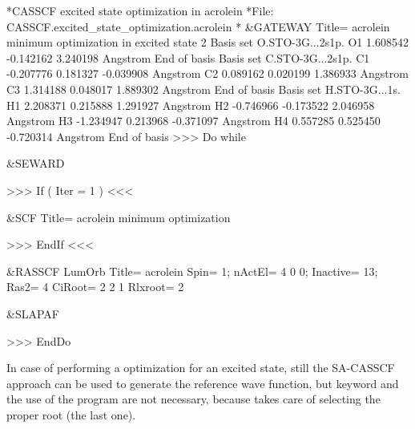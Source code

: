 \begin{inputlisting}
*CASSCF excited state optimization in acrolein
*File: CASSCF.excited_state_optimization.acrolein
*
 &GATEWAY
Title= acrolein minimum optimization in excited state 2
Basis set
O.STO-3G...2s1p.
O1       1.608542      -0.142162       3.240198 Angstrom
End of basis
Basis set
C.STO-3G...2s1p.
C1      -0.207776       0.181327      -0.039908 Angstrom
C2       0.089162       0.020199       1.386933 Angstrom
C3       1.314188       0.048017       1.889302 Angstrom
End of basis
Basis set
H.STO-3G...1s.
H1       2.208371       0.215888       1.291927 Angstrom
H2      -0.746966      -0.173522       2.046958 Angstrom
H3      -1.234947       0.213968      -0.371097 Angstrom
H4       0.557285       0.525450      -0.720314 Angstrom
End of basis
>>> Do while

 &SEWARD  
                                                                                                                                                                            
>>> If ( Iter = 1 ) <<<
                                                                                                                                                                            
 &SCF 
Title= acrolein minimum optimization
                                                                                                                                                                            
>>> EndIf <<<

 &RASSCF 
LumOrb
Title= acrolein
Spin= 1; nActEl= 4 0 0; Inactive= 13; Ras2= 4
CiRoot= 2 2 1
Rlxroot= 2
                                                                                                                                                                            
 &SLAPAF 
                                                                                                                                                                            
>>> EndDo
\end{inputlisting}

In case of performing a  optimization for an excited
state, still the SA-CASSCF approach can be used to generate the reference
wave function, but keyword  and the use of the  program
are not necessary, because  takes care of selecting
the proper root (the last one).

